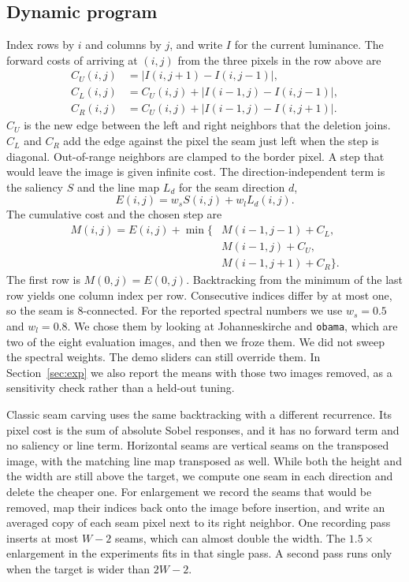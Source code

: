 \documentclass[10pt,twocolumn,letterpaper]{article}
\begin{document}
\subsection{Dynamic program}
Index rows by $i$ and columns by $j$, and write $I$ for the current luminance.
The forward costs of arriving at $(i,j)$ from the three pixels in the row above are
\begin{align}
C_U(i,j) &= \lvert I(i,j{+}1) - I(i,j{-}1) \rvert, \label{eq:cu}\\
C_L(i,j) &= C_U(i,j) + \lvert I(i{-}1,j) - I(i,j{-}1) \rvert, \label{eq:cl}\\
C_R(i,j) &= C_U(i,j) + \lvert I(i{-}1,j) - I(i,j{+}1) \rvert. \label{eq:cr}
\end{align}
$C_U$ is the new edge between the left and right neighbors that the deletion joins.
$C_L$ and $C_R$ add the edge against the pixel the seam just left when the step is diagonal.
Out-of-range neighbors are clamped to the border pixel.
A step that would leave the image is given infinite cost.
The direction-independent term is the saliency $S$ and the line map $L_d$ for the seam direction $d$,
\begin{equation}
E(i,j) = w_s S(i,j) + w_l L_d(i,j).
\label{eq:extra}
\end{equation}
The cumulative cost and the chosen step are
\begin{equation}
\begin{aligned}
M(i,j) = E(i,j) + \min\big\{
&M(i{-}1,j{-}1)+C_L,\\
&M(i{-}1,j)+C_U,\\
&M(i{-}1,j{+}1)+C_R
\big\}.
\end{aligned}
\label{eq:dp}
\end{equation}
The first row is $M(0,j) = E(0,j)$.
Backtracking from the minimum of the last row yields one column index per row.
Consecutive indices differ by at most one, so the seam is 8-connected.
For the reported spectral numbers we use $w_s = 0.5$ and $w_l = 0.8$.
We chose them by looking at Johanneskirche and \texttt{obama}, which are two of the eight evaluation images, and then we froze them.
We did not sweep the spectral weights.
The demo sliders can still override them.
In Section~\ref{sec:exp} we also report the means with those two images removed, as a sensitivity check rather than a held-out tuning.

Classic seam carving uses the same backtracking with a different recurrence.
Its pixel cost is the sum of absolute Sobel responses, and it has no forward term and no saliency or line term.
Horizontal seams are vertical seams on the transposed image, with the matching line map transposed as well.
While both the height and the width are still above the target, we compute one seam in each direction and delete the cheaper one.
For enlargement we record the seams that would be removed, map their indices back onto the image before insertion, and write an averaged copy of each seam pixel next to its right neighbor.
One recording pass inserts at most $W-2$ seams, which can almost double the width.
The $1.5\times$ enlargement in the experiments fits in that single pass.
A second pass runs only when the target is wider than $2W-2$.
\end{document}
